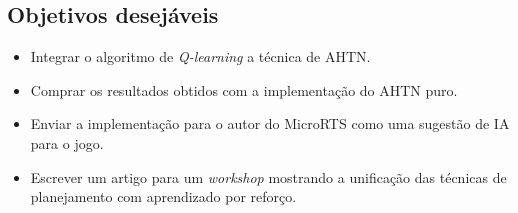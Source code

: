 \subsection{Objetivos desejáveis}
\begin{itemize}
	\item Integrar o algoritmo de \textit{Q-learning} a técnica de AHTN.
	\item Comprar os resultados obtidos com a implementação do AHTN puro.
	\item Enviar a implementação para o autor do MicroRTS como uma sugestão de IA para o jogo.
	\item Escrever um artigo para um \textit{workshop} mostrando a unificação das técnicas de planejamento com aprendizado por reforço.
\end{itemize}

